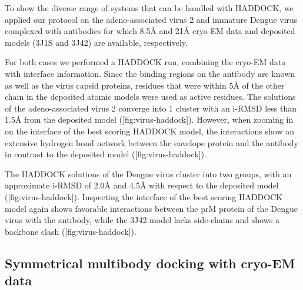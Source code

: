 {}

To show the diverse range of systems that can be handled with HADDOCK, we applied our protocol on the adeno-associated virus 2 and immature Dengue virus complexed with antibodies for which 8.5Å and 21Å cryo-EM data and deposited models (3J1S and 3J42) are available, respectively.

For both cases we performed a HADDOCK run, combining the cryo-EM data with interface information. Since the binding regions on the antibody are known as well as the virus capsid proteins, residues that were within 5Å of the other chain in the deposited atomic models were used as active residues. 
The solutions of the adeno-associated virus 2 converge into 1 cluster with an i-RMSD less than 1.5Å from the deposited model ([fig:virus-haddock]). 
However, when zooming in on the interface of the best scoring HADDOCK model, the interactions show an extensive hydrogen bond network between the envelope protein and the antibody in contrast to the deposited model ([fig:virus-haddock]). 

The HADDOCK solutions of the Dengue virus cluster into two groups, with an approximate i-RMSD of 2.0Å and 4.5Å with respect to the deposited model ([fig:virus-haddock]). 
Inspecting the interface of the best scoring HADDOCK model again shows favorable interactions between the prM protein of the Dengue virus with the antibody, while the 3J42-model lacks side-chains and shows a backbone clash ([fig:virus-haddock]). 

\subsection{Symmetrical multibody docking with cryo-EM data}

{}

